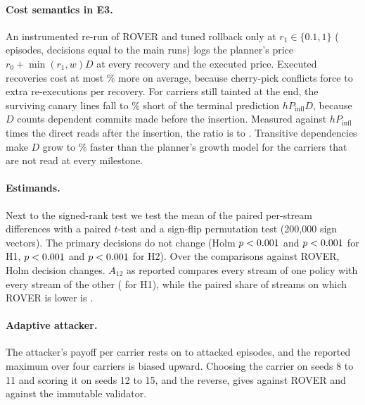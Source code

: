 \documentclass[11pt]{article}
\theoremstyle{definition}
\begin{document}
\paragraph{Cost semantics in E3.} An instrumented re-run of ROVER and tuned rollback only at
$r_1\in\{0.1,1\}$ (\PostCsEpisodes{} episodes, decisions equal to the main runs) logs the planner's price
$r_0+\min(r_1,w)D$ at every recovery and the executed price. Executed recoveries cost at most
\PostCsCostErrMax\% more on average, because cherry-pick conflicts force \PostCsConfMin{} to
\PostCsConfMax{} extra re-executions per recovery. For carriers still tainted at the end, the surviving canary
lines fall \PostCsResLowMin{} to \PostCsResLowMax\% short of the terminal prediction $hP_{\mathrm{infl}}D$,
because $D$ counts dependent commits made before the insertion. Measured against $hP_{\mathrm{infl}}$
times the direct reads after the insertion, the ratio is \PostCsDirectMin{} to \PostCsDirectMax. Transitive dependencies make $D$ grow
\PostCsGrowMin{} to \PostCsGrowMax\% faster than the planner's growth model for the carriers that are not read
at every milestone.

\paragraph{Estimands.} Next to the signed-rank test we test the mean of the paired per-stream differences
with a paired $t$-test and a sign-flip permutation test (200{,}000 sign vectors). The primary decisions do
not change (Holm $p<0.001$ and $p<0.001$ for H1, $p<0.001$ and $p<0.001$ for H2).
Over the \PostStTests{} comparisons against ROVER, \PostStFlips{} Holm decision changes. $A_{12}$ as reported
compares every stream of one policy with every stream of the other (\PostStHOneAtw{} for H1), while the
paired share of streams on which ROVER is lower is \PostStHOneWin.

\paragraph{Adaptive attacker.} The attacker's payoff per carrier rests on \PostAdNMin{} to \PostAdNMax{}
attacked episodes, and the reported maximum over four carriers is biased upward. Choosing the carrier on
seeds 8 to 11 and scoring it on seeds 12 to 15, and the reverse, gives \PostAdRoSplit{} against ROVER and
\PostAdVaSplit{} against the immutable validator.
\end{document}
